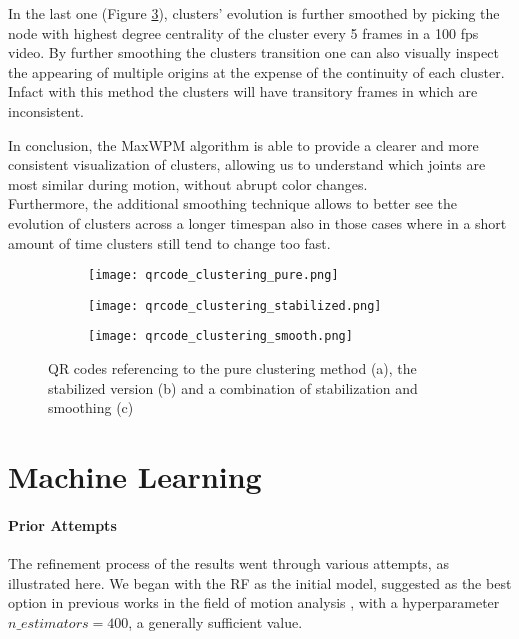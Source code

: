 In the last one (Figure \ref{fig:qr_movement_smooth}), clusters' evolution is further smoothed by picking the node with highest degree centrality of the cluster every 5 frames in a 100 fps video.
By further smoothing the clusters transition one can also visually inspect the appearing of multiple origins at the expense of the continuity of each cluster. 
Infact with this method the clusters will have transitory frames in which are inconsistent.

In conclusion, the MaxWPM algorithm is able to provide a clearer and more consistent visualization of clusters, allowing us to understand which joints are most similar during motion, without abrupt color changes. \\
Furthermore, the additional smoothing technique allows to better see the evolution of clusters across a longer timespan also in those cases where in a short amount of time clusters still tend to change too fast.\\

\clearpage
\begin{figure}[H]
  \centering
  \begin{subfigure}[b]{0.45\textwidth}
    \centering
    \texttt{[image: qrcode\_clustering\_pure.png]}
    \caption{}
    \label{fig:qr_movement_pure}
  \end{subfigure}
  \hspace{0.08\textwidth}
  \begin{subfigure}[b]{0.45\textwidth}
    \centering
    \texttt{[image: qrcode\_clustering\_stabilized.png]}
    \caption{}
    \label{fig:qr_movement_stabilized}
  \end{subfigure}
  \hfill
  \begin{subfigure}[b]{0.45\textwidth}
    \vspace{0.6cm}
    \centering
    \texttt{[image: qrcode\_clustering\_smooth.png]}
    \caption{}
    \label{fig:qr_movement_smooth}
  \end{subfigure}
  \caption{QR codes referencing to the pure clustering method (a), the stabilized version (b) and a combination of stabilization and smoothing (c)}
  \label{fig:qr_movements}
\end{figure}
\clearpage

\section{Machine Learning}

\paragraph{Prior Attempts}
The refinement process of the results went through various attempts, as illustrated here. 
We began with the RF as the initial model, suggested as the best option in previous works in the field of motion analysis \cite{oneto:2020}, with a hyperparameter $n\_estimators = 400$, a generally sufficient value.

